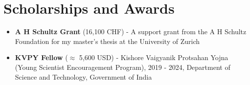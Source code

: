 
\section{Scholarships and Awards}



\begin{itemize}

    \item \textbf{A H Schultz Grant} { (16,100 CHF) - A support grant from the A H Schultz Foundation for my master's thesis at the University of Zurich} 
    
    \item \textbf{KVPY Fellow} { ($\approx$ 5,600 USD) - Kishore Vaigyanik Protsahan Yojna (Young Scientist Encouragement Program), 2019 - 2024, Department of Science and Technology, Government of India}
  
\end{itemize}